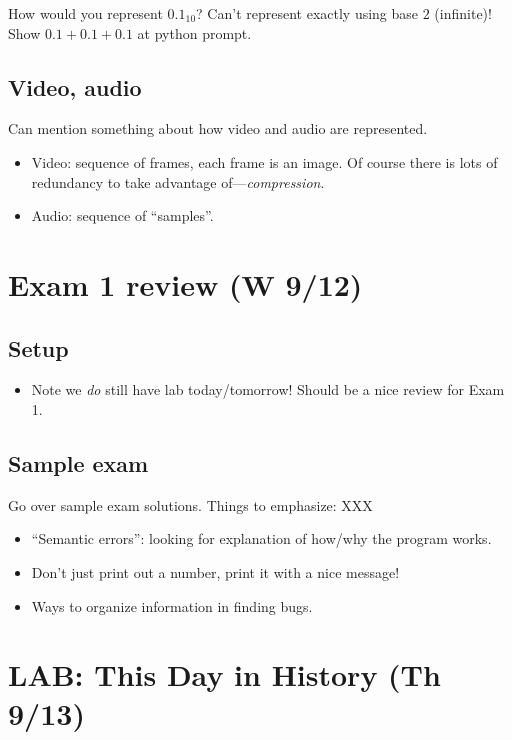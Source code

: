 \documentclass{article}
\begin{document}
How would you represent $0.1_{10}$?  Can't represent exactly using
base $2$ (infinite)! Show $0.1 + 0.1 + 0.1$ at python prompt.

\subsection*{Video, audio}

Can mention something about how video and audio are represented.
\begin{itemize}
\item Video: sequence of frames, each frame is an image.  Of course
  there is lots of redundancy to take advantage
  of---\emph{compression}.
\item Audio: sequence of ``samples''.
\end{itemize}

\newpage
\section{Exam 1 review (W 9/12)}

\subsection*{Setup}

\begin{itemize}
\item Note we \emph{do} still have lab today/tomorrow!  Should be a
  nice review for Exam 1.
\end{itemize}

\subsection*{Sample exam}

Go over sample exam solutions.  Things to emphasize:  XXX
\begin{itemize}
\item ``Semantic errors'': looking for explanation of how/why the
  program works.
\item Don't just print out a number, print it with a nice message!
\item Ways to organize information in finding bugs.
\end{itemize}

\newpage
\section*{LAB: This Day in History (Th 9/13)}
\end{document}
